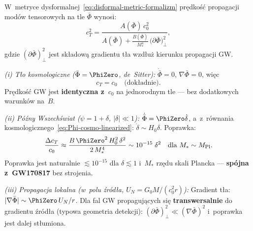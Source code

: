 \begin{proposition}\label{prop:cT}
W~metryce dysformalnej~\eqref{eq:disformal-metric-formalizm}
pr\k{e}dko\'s\'c propagacji mod\'ow tensorowych na tle $\bar\Phi$
wynosi:
\begin{equation}\label{eq:cT}
  \boxed{
    c_T^2 = \frac{A(\bar\Phi)\,c_0^2}
    {A(\bar\Phi) + \displaystyle\frac{B(\bar\Phi)}{M_*^4}\,
    \bigl(\partial\bar\Phi\bigr)^2_{\!\perp}},
  }
\end{equation}
gdzie $(\partial\bar\Phi)^2_{\perp}$ jest sk\l{}adow\k{a}
gradientu t\l{}a wzd\l{}u\.z kierunku propagacji GW.

\medskip\noindent
\emph{(i) T\l{}o kosmologiczne ($\bar\Phi = \PhiZero$, de~Sitter):}
$\dot{\bar\Phi} = 0$, $\nabla\bar\Phi = 0$, wi\k{e}c
\begin{equation}\label{eq:cT-cosmo}
  c_T = c_0 \quad \text{(dok\l{}adnie)}.
\end{equation}
Pr\k{e}dko\'s\'c GW jest \textbf{identyczna z~$c_0$}
na jednorodnym tle --- bez dodatkowych warunk\'ow na~$B$.

\medskip\noindent
\emph{(ii) P\'o\'zny Wszech\'swiat ($\psi = 1 + \delta$, $|\delta| \ll 1$):}
$\dot{\bar\Phi} = \PhiZero\dot\delta$, a~z~r\'ownania
kosmologicznego~\eqref{eq:Phi-cosmo-linearized}:
$\dot\delta \sim H_0\delta$. Poprawka:
\begin{equation}\label{eq:cT-late}
  \frac{\Delta c_T}{c_0}
  \approx \frac{B\,\PhiZero^2\,H_0^2\,\delta^2}{2\,M_*^4}
  \sim 10^{-15}\;\delta^2
  \quad \text{dla } M_* \sim M_{\mathrm{Pl}}.
\end{equation}
Poprawka jest naturalnie $\lesssim 10^{-15}$
dla $\delta \lesssim 1$ i~$M_*$ rz\k{e}du skali Plancka ---
\textbf{sp\'ojna z~GW170817} bez strojenia.

\medskip\noindent
\emph{(iii) Propagacja lokalna (w~polu \'zr\'od\l{}a,
$U_N = G_0 M/(c_0^2 r)$):}
Gradient t\l{}a: $|\nabla\bar\Phi| \sim \PhiZero\,U_N/r$.
Dla fal GW propaguj\k{a}cych si\k{e} \textbf{transwersalnie}
do gradientu \'zr\'od\l{}a (typowa geometria detekcji):
$(\partial\bar\Phi)^2_{\perp} \ll (\nabla\bar\Phi)^2$
i~poprawka jest dalej st\l{}umiona.
\end{proposition}

